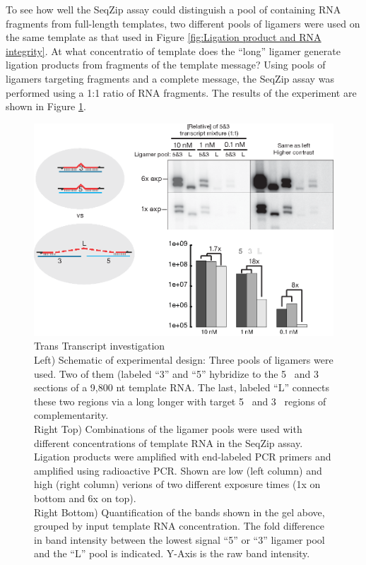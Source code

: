     To see how well the SeqZip assay could distinguish a pool of containing RNA fragments from full-length templates, two different pools of ligamers were used on the same template as that used in Figure \ref{fig:Ligation product and RNA integrity}. At what concentratio of template does the ``long'' ligamer generate ligation products from fragments of the template message? Using pools of ligamers targeting fragments and a complete message, the SeqZip assay was performed using a 1:1 ratio of RNA fragments. The results of the experiment are shown in Figure \ref{fig: trans Tx for degregation}.

  	\begin{figure}[htbp] %
    	\centering 
    	\includegraphics{Figures/Chapter2/TransRNAWithSeqZip.eps}
    	\caption[Trans Transcript investigation]
    	{
	      Trans Transcript investigation\\
  	    Left) Schematic of experimental design: Three pools of ligamers were used. Two of them (labeled ``3'' and ``5'' hybridize to the 5\textprime~ and 3\textprime~ sections of a 9,800 nt template RNA. The last, labeled ``L'' connects these two regions via a long longer with target 5\textprime~ and 3\textprime~ regions of complementarity. \\
        Right Top) Combinations of the ligamer pools were used with different concentrations of template RNA in the SeqZip assay. Ligation products were amplified with end-labeled PCR primers and amplified using radioactive PCR. Shown are low (left column) and high (right column) verions of two different exposure times (1x on bottom and 6x on top). \\
        Right Bottom) Quantification of the bands shown in the gel above, grouped by input template RNA concentration. The fold difference in band intensity between the lowest signal ``5'' or ``3'' ligamer pool and the ``L'' pool is indicated. Y-Axis is the raw band intensity.
		    }
   	 \label{fig: trans Tx for degregation}
	 	 \end{figure}

